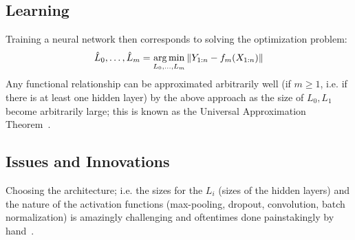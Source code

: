 \subsection{Learning}
Training a neural network then corresponds to solving the optimization problem:
\begin{equation}
    \hat L_0,\dotsc,\hat L_m = \operatorname*{\arg\min}_{L_0,\dotsc,L_m} \left\lVert Y_{1:n} - f_m(X_{1:n})\right\rVert
\end{equation}
Any functional relationship can be approximated arbitrarily well (if $m\ge 1$, i.e. if there is at least one hidden layer) by the above approach as the size of $L_0,L_1$ become arbitrarily large; this is known as the Universal Approximation Theorem~\cite{Hor91}.

\subsection{Issues and Innovations}
Choosing the architecture; i.e. the sizes for the $L_i$ (sizes of the hidden layers) and the nature of the activation functions (max-pooling, dropout, convolution, batch normalization) is amazingly challenging and oftentimes done painstakingly by hand~\cite{Rea17,Zop17}.

